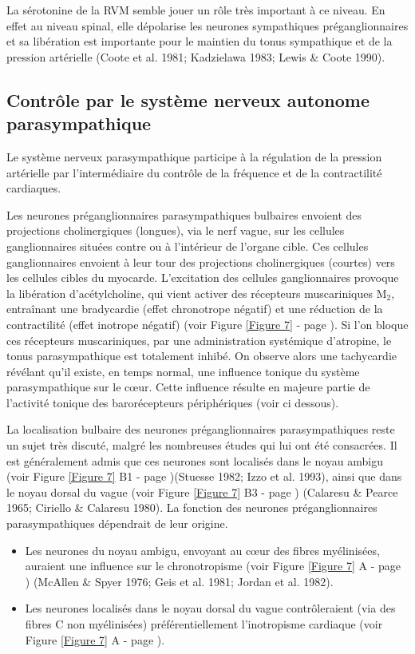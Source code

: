 \documentclass[a4paper,12pt,twoside]{report}
\begin{document}
La sérotonine de la RVM semble jouer un rôle très important à ce niveau. En effet au niveau spinal, elle dépolarise les neurones sympathiques préganglionnaires et sa libération est importante pour le maintien du tonus sympathique et de la pression artérielle (Coote et al. 1981; Kadzielawa 1983; Lewis \& Coote 1990).

\subsection{Contrôle par le système nerveux autonome parasympathique}

Le système nerveux parasympathique participe à la régulation de la pression artérielle par l’intermédiaire du contrôle de la fréquence et de la contractilité cardiaques.

Les neurones préganglionnaires parasympathiques bulbaires envoient des projections cholinergiques (longues), via le nerf vague, sur les cellules ganglionnaires situées contre ou à l’intérieur de l’organe cible. Ces cellules ganglionnaires envoient à leur tour des projections cholinergiques (courtes) vers les cellules cibles du myocarde. L’excitation des cellules ganglionnaires provoque la libération d’acétylcholine, qui vient activer des récepteurs muscariniques M$_{2}$, entraînant une bradycardie (effet chronotrope négatif) et une réduction de la contractilité (effet inotrope négatif) (voir Figure \ref{Figure 7} - page \pageref{Figure 7}). Si l’on bloque ces récepteurs muscariniques, par une administration systémique d’atropine, le tonus parasympathique est totalement inhibé. On observe alors une tachycardie révélant qu’il existe, en temps normal, une influence tonique du système parasympathique sur le cœur. Cette influence résulte en majeure partie de l’activité tonique des barorécepteurs périphériques (voir ci dessous). 

La localisation bulbaire des neurones préganglionnaires parasympathiques reste un sujet très discuté, malgré les nombreuses études qui lui ont été consacrées. Il est généralement admis que ces neurones sont localisés dans le noyau ambigu (voir Figure \ref{Figure 7} B1 - page \pageref{Figure 7})(Stuesse 1982; Izzo et al. 1993), ainsi que dans le noyau dorsal du vague (voir Figure \ref{Figure 7} B3 - page \pageref{Figure 7}) (Calaresu \& Pearce 1965; Ciriello \& Calaresu 1980). La fonction des neurones préganglionnaires parasympathiques dépendrait de leur origine. 

\begin{itemize}
\item Les neurones du noyau ambigu, envoyant au cœur des fibres myélinisées, auraient une influence sur le chronotropisme (voir Figure \ref{Figure 7} A - page \pageref{Figure 7}) (McAllen \& Spyer 1976; Geis et al. 1981; Jordan et al. 1982). 
\item Les neurones localisés dans le noyau dorsal du vague contrôleraient (via des fibres C non myélinisées) préférentiellement l’inotropisme cardiaque (voir Figure \ref{Figure 7} A - page \pageref{Figure 7}).
\end{itemize}
\end{document}
